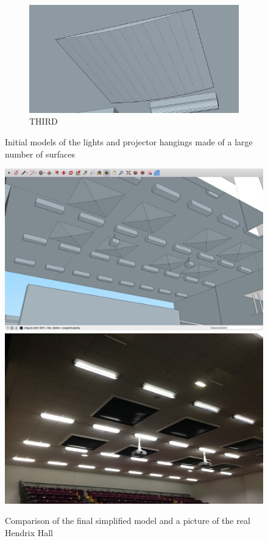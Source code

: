 \documentclass[../../main.tex]{subfiles}
\begin{document}
\begin{figure}[ht]
				\begin{subfigure}[t]{3in}
					\centering
					\includegraphics[scale = 0.25]{Sections/Implementation/Modelling/images/concave1.png}
					\caption{THIRD}
				\end{subfigure}
		
				\caption{Initial models of the lights and projector hangings made of a large number of surfaces}
				\label{surfaces}
			\end{figure}

		\begin{figure}[ht]
				\center\includegraphics[scale = 0.3]{Sections/Implementation/Modelling/images/realVsSku/roofSku.png}
				\center\includegraphics[scale = 0.13]{Sections/Implementation/Modelling/images/HHroof.jpg}
				\caption{Comparison of the final simplified model and a picture of the real Hendrix Hall}
				\label{simpleSurfaces}
			\end{figure}
\end{document}
